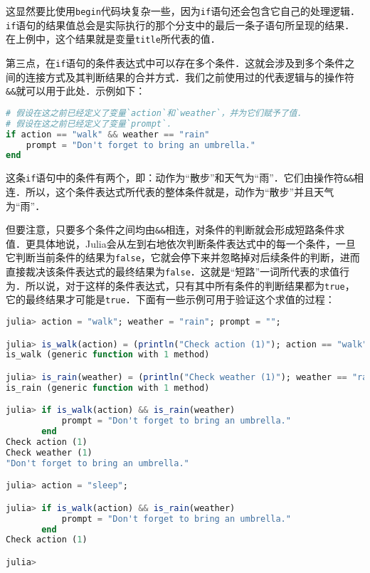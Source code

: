 这显然要比使用\verb|begin|代码块复杂一些，因为\verb|if|语句还会包含它自己的处理逻辑．\verb|if|语句的结果值总会是实际执行的那个分支中的最后一条子语句所呈现的结果．在上例中，这个结果就是变量\verb|title|所代表的值．

第三点，在\verb|if|语句的条件表达式中可以存在多个条件．这就会涉及到多个条件之间的连接方式及其判断结果的合并方式．我们之前使用过的代表逻辑与的操作符\verb|&&|就可以用于此处．示例如下：

\begin{lstlisting}[language=julia]
# 假设在这之前已经定义了变量`action`和`weather`，并为它们赋予了值．
# 假设在这之前已经定义了变量`prompt`．
if action == "walk" && weather == "rain"
    prompt = "Don't forget to bring an umbrella."
end
\end{lstlisting}

这条\verb|if|语句中的条件有两个，即：动作为“散步”和天气为“雨”．它们由操作符\verb|&&|相连．所以，这个条件表达式所代表的整体条件就是，动作为“散步”并且天气为“雨”．

但要注意，只要多个条件之间均由\verb|&&|相连，对条件的判断就会形成短路条件求值．更具体地说，Julia会从左到右地依次判断条件表达式中的每一个条件，一旦它判断当前条件的结果为\verb|false|，它就会停下来并忽略掉对后续条件的判断，进而直接裁决该条件表达式的最终结果为\verb|false|．这就是“短路”一词所代表的求值行为．所以说，对于这样的条件表达式，只有其中所有条件的判断结果都为\verb|true|，它的最终结果才可能是\verb|true|．下面有一些示例可用于验证这个求值的过程：

\begin{lstlisting}[language=julia]
julia> action = "walk"; weather = "rain"; prompt = "";

julia> is_walk(action) = (println("Check action (1)"); action == "walk")
is_walk (generic function with 1 method)

julia> is_rain(weather) = (println("Check weather (1)"); weather == "rain")
is_rain (generic function with 1 method)

julia> if is_walk(action) && is_rain(weather)
           prompt = "Don't forget to bring an umbrella."
       end
Check action (1)
Check weather (1)
"Don't forget to bring an umbrella."

julia> action = "sleep";

julia> if is_walk(action) && is_rain(weather)
           prompt = "Don't forget to bring an umbrella."
       end
Check action (1)

julia> 
\end{lstlisting}


